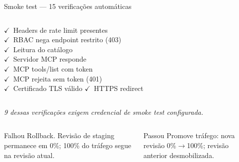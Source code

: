\documentclass[aspectratio=169,10pt]{beamer}
\newcommand{\yes}{\textcolor{mlgreen}{$\checkmark$}}
\begin{document}
\begin{frame}
\begin{block}{Smoke test --- 15 verificações automáticas}
\begin{columns}[T]
      \yes\ Headers de rate limit presentes \\
      \yes\ RBAC nega endpoint restrito (403) \\
      \yes\ Leitura do catálogo \\
      \yes\ Servidor MCP responde \\
      \yes\ MCP tools/list com token \\
      \yes\ MCP rejeita sem token (401) \\
      \yes\ Certificado TLS válido \quad \yes\ HTTPS redirect \\
    \end{columns}
    \vspace{1pt}
    {\tiny\itshape 9 dessas verificações exigem credencial de smoke test configurada.}
  \end{block}
  \vspace{-4pt}
  \par
  \vspace{-3pt}
  \begin{columns}[T]
    \centering{}
    \centering{}
  \end{columns}
  \vspace{-8pt}
  \begin{columns}[T]
    \begin{alertblock}{\small Falhou}
      \scriptsize Rollback. Revisão de staging permanece em 0\%; 100\% do
      tráfego segue na revisão atual.
    \end{alertblock}
    \begin{exampleblock}{\small Passou}
      \scriptsize Promove tráfego: nova revisão 0\%$\to$100\%; revisão
      anterior desmobilizada.
    \end{exampleblock}
  \end{columns}
\end{frame}
\end{document}

